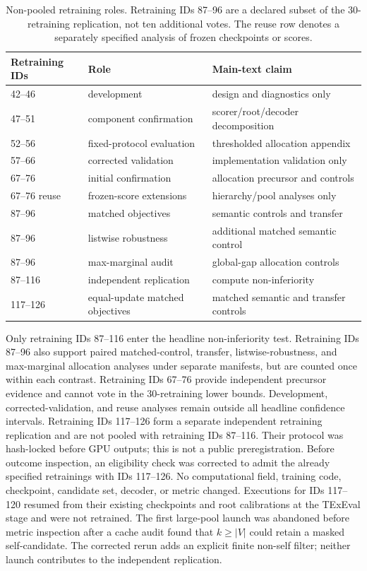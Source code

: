 \documentclass[11pt]{article}
\begin{document}
\begin{table}[h]
\centering
\scriptsize
\setlength{\tabcolsep}{1pt}
\begin{tabular}{p{}p{}p{}}
\toprule
Retraining IDs & Role & Main-text claim\\
\midrule
42--46 & development & design and diagnostics only\\
47--51 & component confirmation & scorer/root/decoder decomposition\\
52--56 & fixed-protocol evaluation & thresholded allocation appendix\\
57--66 & corrected validation & implementation validation only\\
67--76 & initial confirmation & allocation precursor and controls\\
67--76 reuse & frozen-score extensions & hierarchy/pool analyses only\\
87--96 & matched objectives & semantic controls and transfer\\
87--96 & listwise robustness & additional matched semantic control\\
87--96 & max-marginal audit & global-gap allocation controls\\
87--116 & independent replication & compute non-inferiority\\
117--126 & equal-update matched objectives & matched semantic and transfer controls\\
\bottomrule
\end{tabular}
\caption{Non-pooled retraining roles. Retraining IDs 87--96 are a declared subset of the
30-retraining replication, not ten additional votes. The reuse row denotes a
separately specified analysis of frozen checkpoints or scores.}
\end{table}

Only retraining IDs 87--116 enter the headline non-inferiority test. Retraining IDs 87--96 also
support paired matched-control, transfer, listwise-robustness, and
max-marginal allocation analyses under separate manifests, but are counted once within each
contrast. Retraining IDs 67--76 provide independent precursor evidence and cannot vote
in the 30-retraining lower bounds. Development, corrected-validation, and reuse
analyses remain outside all headline confidence intervals. Retraining IDs 117--126
form a separate independent retraining replication and are not pooled with
retraining IDs 87--116. Their protocol was hash-locked before GPU outputs; this is not a
public preregistration. Before outcome inspection, an eligibility check was
corrected to admit the already specified retrainings with IDs 117--126. No computational field,
training code, checkpoint, candidate set, decoder, or metric changed. Executions for IDs
117--120 resumed from their existing checkpoints and root calibrations at the
TExEval stage and were not retrained.
The first large-pool launch was abandoned before metric inspection after a
cache audit found that $k\geq |V|$ could retain a masked self-candidate. The
corrected rerun adds an explicit finite non-self filter; neither
launch contributes to the independent replication.
\end{document}
